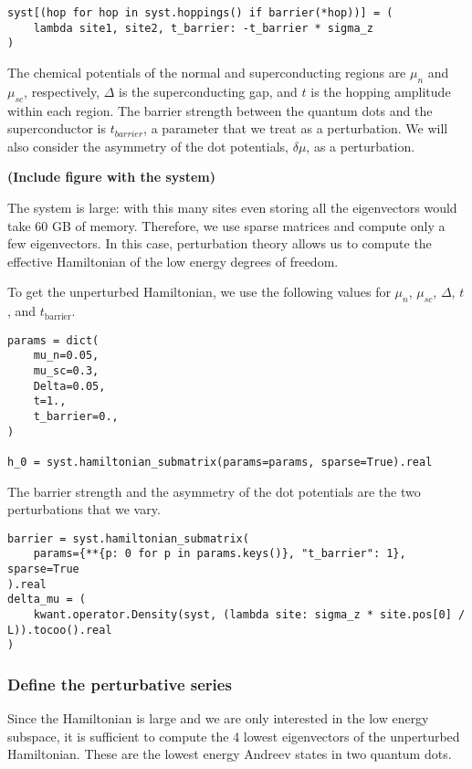 \documentclass[submission, Codebases]{SciPost}
\begin{document}
{{\begin{verbatim}
syst[(hop for hop in syst.hoppings() if barrier(*hop))] = (
    lambda site1, site2, t_barrier: -t_barrier * sigma_z
)
\end{verbatim}

The chemical potentials of the normal and superconducting regions are $\mu_n$
and $\mu_{sc}$, respectively, $\Delta$ is the superconducting gap, and $t$
is the hopping amplitude within each region.
The barrier strength between the quantum dots and the superconductor is
$t_{barrier}$, a parameter that we treat as a perturbation.
We will also consider the asymmetry of the dot potentials, $\delta \mu$, as a
perturbation.

\textbf{(Include figure with the system)}

The system is large: with this many sites even storing all the eigenvectors
would take 60 GB of memory.
Therefore, we use sparse matrices and compute only a few eigenvectors.
In this case, perturbation theory allows us to compute the effective
Hamiltonian of the low energy degrees of freedom.

To get the unperturbed Hamiltonian, we use the following values for $\mu_n$,
$\mu_{sc}$, $\Delta$, $t$, and $t_{\text{barrier}}$.

\begin{verbatim}
params = dict(
    mu_n=0.05,
    mu_sc=0.3,
    Delta=0.05,
    t=1.,
    t_barrier=0.,
)

h_0 = syst.hamiltonian_submatrix(params=params, sparse=True).real
\end{verbatim}

The barrier strength and the asymmetry of the dot potentials are the two
perturbations that we vary.

\begin{verbatim}
barrier = syst.hamiltonian_submatrix(
    params={**{p: 0 for p in params.keys()}, "t_barrier": 1}, sparse=True
).real
delta_mu = (
    kwant.operator.Density(syst, (lambda site: sigma_z * site.pos[0] / L)).tocoo().real
)
\end{verbatim}

\subsubsection{Define the perturbative series}

Since the Hamiltonian is large and we are only interested in the low energy
subspace, it is sufficient to compute the 4 lowest eigenvectors of the
unperturbed Hamiltonian.
These are the lowest energy Andreev states in two quantum dots.

}}
\end{document}
